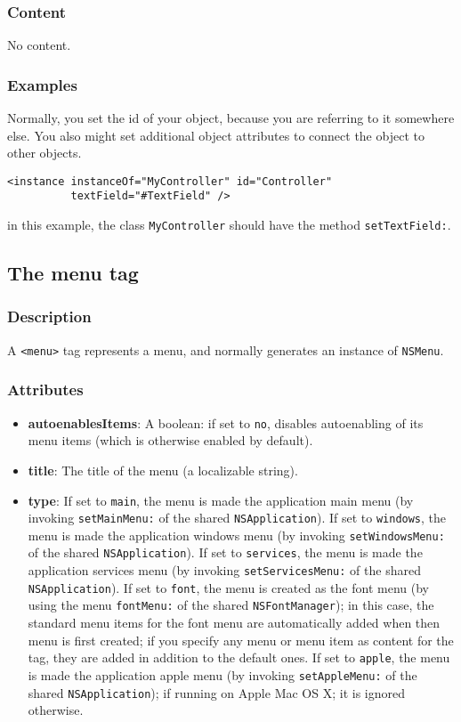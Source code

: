 \subsubsection{Content}
No content.

\subsubsection{Examples}
Normally, you set the id of your object, because you are referring to
it somewhere else.  You also might set additional object attributes to
connect the object to other objects.
\begin{verbatim}
<instance instanceOf="MyController" id="Controller" 
          textField="#TextField" />
\end{verbatim}
in this example, the class \texttt{MyController} should have the method
\texttt{setTextField:}.

\subsection{The menu tag}

\subsubsection{Description}
A \texttt{<menu>} tag represents a menu, and normally generates an
instance of \texttt{NSMenu}.

\subsubsection{Attributes}
\begin{itemize}
\item {\bf autoenablesItems}: A boolean: if set to \texttt{no},
  disables autoenabling of its menu items (which is otherwise enabled
  by default).
\item {\bf title}: The title of the menu (a localizable string).
\item {\bf type}: If set to \texttt{main}, the menu is made the
  application main menu (by invoking \texttt{setMainMenu:} of the
  shared \texttt{NSApplication}).  If set to \texttt{windows}, the
  menu is made the application windows menu (by invoking
  \texttt{setWindowsMenu:} of the shared \texttt{NSApplication}).  If
  set to \texttt{services}, the menu is made the application services
  menu (by invoking \texttt{setServicesMenu:} of the shared
  \texttt{NSApplication}).  If set to \texttt{font}, the menu is
  created as the font menu (by using the menu \texttt{fontMenu:} of
  the shared \texttt{NSFontManager}); in this case, the standard menu
  items for the font menu are automatically added when then menu is
  first created; if you specify any menu or menu item as content for
  the tag, they are added in addition to the default ones.  If set to
  \texttt{apple}, the menu is made the application apple menu (by
  invoking \texttt{setAppleMenu:} of the shared
  \texttt{NSApplication}); if running on Apple Mac OS X; it is ignored
  otherwise.
\end{itemize}

